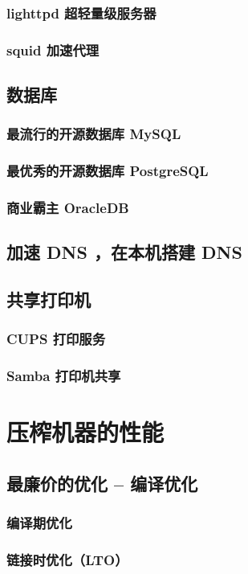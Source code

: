 \documentclass[amstex,twoside]{ctexbook}
\begin{document}
\subsection{ lighttpd 超轻量级服务器}
\subsection{ squid 加速代理	}
\section{  数据库	}
\subsection{  最流行的开源数据库 MySQL}
\subsection{  最优秀的开源数据库 PostgreSQL 	}
\subsection{  商业霸主 OracleDB	}
\section{  加速 DNS ，在本机搭建 DNS	}
\section{  共享打印机	}
\subsection{ CUPS 打印服务	}
\subsection{ Samba 打印机共享	}


\chapter{压榨机器的性能}
\section{  最廉价的优化 – 编译优化	}
\subsection{  编译期优化	}
\subsection{  链接时优化（LTO）	}
\end{document}
